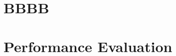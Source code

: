 \documentclass[a4paper, 12pt, oneside, BCOR1cm,toc=chapterentrywithdots]{scrbook}
\begin{document}
\begin{appendices}

%
\chapter{BBBB}

\chapter{Performance Evaluation}

			
\end{appendices}
\end{document}
